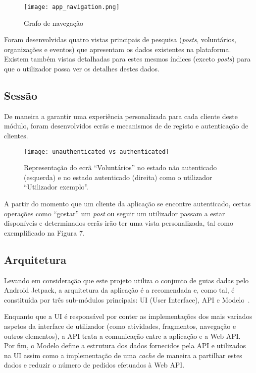 \begin{figure}[h]
	\centering
	\texttt{[image: app\_navigation.png]}
	\caption{Grafo de navegação}
\end{figure}

Foram desenvolvidas quatro vistas principais de pesquisa (\textit{posts}, voluntários, organizações e eventos) que apresentam os dados existentes na plataforma. Existem também vistas detalhadas para estes mesmos índices (exceto \textit{posts}) para que o utilizador possa ver os detalhes destes dados.

\bigskip

\subsection{Sessão}

De maneira a garantir uma experiência personalizada para cada cliente deste módulo, foram desenvolvidos ecrãs e mecanismos de de registo e autenticação de clientes.

\begin{figure}[h]
	\centering
	\texttt{[image: unauthenticated\_vs\_authenticated]}
	\caption{Representação do ecrã ``Voluntários'' no estado não autenticado (esquerda) e no estado autenticado (direita) como o utilizador ``Utilizador exemplo''.}
\end{figure}

A partir do momento que um cliente da aplicação se encontre autenticado, certas operações como ``gostar'' um \textit{post} ou seguir um utilizador passam a estar disponíveis e determinados ecrãs irão ter uma vista personalizada, tal como exemplificado na Figura 7.

\subsection{Arquitetura}

Levando em consideração que este projeto utiliza o conjunto de guias dadas pelo Android Jetpack,
a arquitetura da aplicação é a recomendada e, como tal, é constituída por três sub-módulos principais: UI (User Interface), API e Modelo~\cite{AndroidJetpack2020}.

\medskip

Enquanto que a UI é responsável por conter as implementações dos mais variados aspetos da interface de utilizador (como atividades, fragmentos, navegação e outros elementos), a API trata a comunicação entre a aplicação e a Web API. Por fim, o Modelo define a estrutura dos dados fornecidos pela API e utilizados na UI assim como a implementação de uma \textit{cache} de maneira a partilhar estes dados e reduzir o número de pedidos efetuados à Web API.

